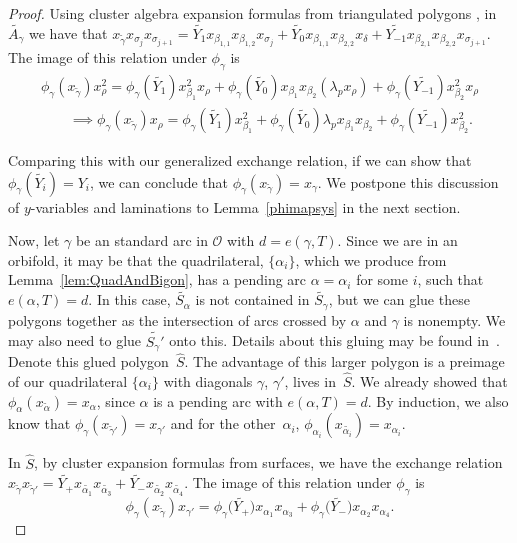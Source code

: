 \documentclass[11pt]{article}
\numberwithin{equation}{section}
\begin{document}
\begin{proof}
Using cluster algebra expansion formulas from triangulated polygons \cite{MSW}, in $\widetilde{A_\gamma}$ we have that $x_{\widetilde{\gamma}}x_{\sigma_j}x_{\sigma_{j+1}} = \widetilde{Y_1} x_{\beta_{1,1}}x_{\beta_{1,2}}x_{\sigma_j} + \widetilde{Y_0} x_{\beta_{1,1}}x_{\beta_{2,2}}x_{\delta} + \widetilde{Y_{-1}}x_{\beta_{2,1}}x_{\beta_{2,2}}x_{\sigma_{j+1}}$. The image of this relation under $\phi_\gamma$ is
\begin{gather}
\phi_\gamma(x_{\widetilde{\gamma}})x_{\rho}^2 = \phi_\gamma(\widetilde{Y_1}) x_{\beta_1}^2x_{\rho} + \phi_\gamma(\widetilde{Y_0}) x_{\beta_1}x_{\beta_2}(\lambda_px_\rho)+ \phi_\gamma(\widetilde{Y_{-1}})x_{\beta_2}^2x_{\rho}\nonumber
\\
\qquad{} \implies\phi_\gamma(x_{\widetilde{\gamma}})x_{\rho} = \phi_\gamma(\widetilde{Y_1}) x_{\beta_1}^2 +\phi_\gamma(\widetilde{Y_0}) \lambda_px_{\beta_1}x_{\beta_2}+ \phi_\gamma(\widetilde{Y_{-1}})x_{\beta_2}^2.\label{genmutate}
\end{gather}

Comparing this with our generalized exchange relation, if we can show that $\phi_\gamma(\widetilde{Y_i}) = Y_i$, we can conclude that $\phi_\gamma(x_{\widetilde{\gamma}}) = x_\gamma$. We postpone this discussion of $y$-variables and laminations to Lemma~\ref{phimapsys} in the next section.

Now, let $\gamma$ be an standard arc in $\mathcal{O}$ with $d = e(\gamma, T)$. Since we are in an orbifold, it may be that the quadrilateral, $\{\alpha_i\}$, which we produce from Lemma~\ref{lem:QuadAndBigon}, has a pending arc $\alpha = \alpha_i$ for some $i$, such that $e(\alpha,T) = d$. In this case, $\widetilde{S_\alpha}$ is not contained in $\widetilde{S_\gamma}$, but we can glue these polygons together as the intersection of arcs crossed by $\alpha$ and $\gamma$ is nonempty. We may also need to glue $\widetilde{S_\gamma'}$ onto this. Details about this gluing may be found in~\cite{MSW}. Denote this glued polygon~$\hat{S}$. The advantage of this larger polygon is a preimage of our quadrilateral $\{\alpha_i\}$ with diagonals $\gamma$, $\gamma'$, lives in~$\hat{S}$. We already showed that $\phi_\alpha(x_{\widetilde{\alpha}}) = x_\alpha$, since $\alpha$ is a pending arc with $e(\alpha,T) = d$. By induction, we also know that $\phi_{\gamma}(x_{\widetilde{\gamma}'}) = x_{\gamma'}$ and for the other~$\alpha_i$, $\phi_{\alpha_i}(x_{\widetilde{\alpha_i}}) = x_{\alpha_i}$.

In $\hat{S}$, by cluster expansion formulas from surfaces, we have the exchange relation $x_{\widetilde{\gamma}} x_{\widetilde{\gamma}'}= \widetilde{Y_+}x_{\widetilde{\alpha_1}}x_{\widetilde{\alpha_3}} + \widetilde{Y_-}x_{\widetilde{\alpha_2}}x_{\widetilde{\alpha_4}}$. The image of this relation under $\phi_\gamma$ is \[
\phi_\gamma(x_{\widetilde{\gamma}}) x_{\gamma'} = \phi_\gamma\big(\widetilde{Y_+}\big)x_{\alpha_1}x_{\alpha_3} + \phi_\gamma\big(\widetilde{Y_-}\big)x_{\alpha_2}x_{\alpha_4}.
\]


\end{proof}
\end{document}
